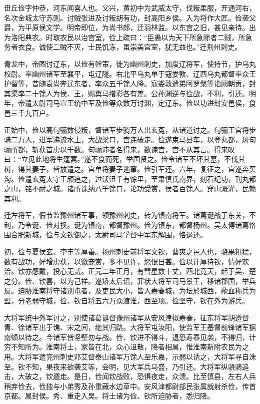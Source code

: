\documentclass[12pt,UTF8]{ctexbook}
\begin{document}
毌丘俭字仲恭，河东闻喜人也。父兴，黄初中为武威太守，伐叛柔服，开通河右，名次金城太守苏则。讨贼张进及讨叛胡有功，封高阳乡侯。入为将作大匠。俭袭父爵，为平原侯文学。明帝即位，为尚书郎，迁羽林监。以东宫之旧，甚见亲待。出为洛阳典农。时取农民以治宫室，俭上疏曰：“臣愚以为天下所急除者二贼，所急务者衣食。诚使二贼不灭，士民饥冻，虽崇美宫室，犹无益也。”迁荆州刺史。

青龙中，帝图讨辽东，以俭有幹策，徙为幽州刺史，加度辽将军，使持节，护乌丸校尉。率幽州诸军至襄平，屯辽隧。右北平乌丸单于寇娄敦、辽西乌丸都督率众王护留等，昔随袁尚奔辽东者，率众五千馀人降。寇娄敦遣弟阿罗槃等诣阙朝贡，封其渠率二十馀人为侯、王，赐舆马缯彩各有差。公孙渊逆与俭战，不利，引还。明年，帝遣太尉司马宣王统中军及俭等众数万讨渊，定辽东。俭以功进封安邑侯，食邑三千九百户。

正始中，俭以高句骊数侵叛，督诸军步骑万人出玄菟，从诸道讨之。句骊王宫将步骑二万人，进军沸流水上，大战梁口，宫连破走。俭遂束马县车，以登丸都，屠句骊所都，斩获首虏以千数。句骊沛者名得来，数谏宫，宫不从其言。得来叹曰：“立见此地将生蓬蒿。”遂不食而死，举国贤之。俭令诸军不坏其墓，不伐其树，得其妻子，皆放遣之。宫单将妻子逃窜。俭引军还。六年，复征之，宫遂奔买沟。俭遣玄菟太守王颀追之，过沃沮千有馀里，至肃慎氏南界，刻石纪功，刊丸都之山，铭不耐之城。诸所诛纳八千馀口，论功受赏，侯者百馀人。穿山溉灌，民赖其利。

迁左将军，假节监豫州诸军事，领豫州刺史，转为镇南将军。诸葛诞战于东关，不利，乃令诞、俭对换。诞为镇南，都督豫州。俭为镇东，都督杨州。吴太傅诸葛恪围合肥新城，俭与文钦御之，太尉司马孚督中军东解围，恪退还。

初，俭与夏侯玄、李丰等厚善。扬州刺史前将军文钦，曹爽之邑人也，骁果粗猛，数有战功，好增虏获，以徼宠赏，多不见许，怨恨日甚。俭以计厚待钦，情好欢洽。钦亦感戴，投心无贰。正元二年正月，有彗星数十丈，西北竟天，起于吴、楚之分。俭、钦喜，以为己祥。遂矫太后诏，罪状大将军司马景王，移诸郡国，举兵反。迫胁淮南将守诸别屯者，及吏民大小，皆入寿春城，为坛於城西，歃血称兵为盟，分老弱守城，俭、钦自将五六万众渡淮，西至项。俭坚守，钦在外为游兵。

大将军统中外军讨之，别使诸葛诞督豫州诸军从安风津拟寿春，征东将军胡遵督青、徐诸军出于谯、宋之间，绝其归路。大将军屯汝阳，使监军王基督前锋诸军据南顿以待之。今诸军皆坚壁勿与战。俭、钦进不得斗，退恐寿春见袭，不得归，计穷不知所为。淮南将士，家皆在北，众心沮散，降者相属，惟淮南新附农民为之用。大将军遣兖州刺史邓艾督泰山诸军万馀人至乐嘉，示弱以诱之，大将军寻自洙至。钦不知，果夜来欲袭艾等，会明，见大军兵马盛，乃引还。大将军纵骁骑追击，大破之，钦遁走。是日，俭闻钦战败，恐惧夜走，众溃。比至慎县，左右人兵稍弃俭去，俭独与小弟秀及孙重藏水边草中。安风津都尉部民张属就射杀俭，传首京都。属封侯。秀、重走入吴。将士诸为俭、钦所迫胁者，悉归降。
\end{document}
